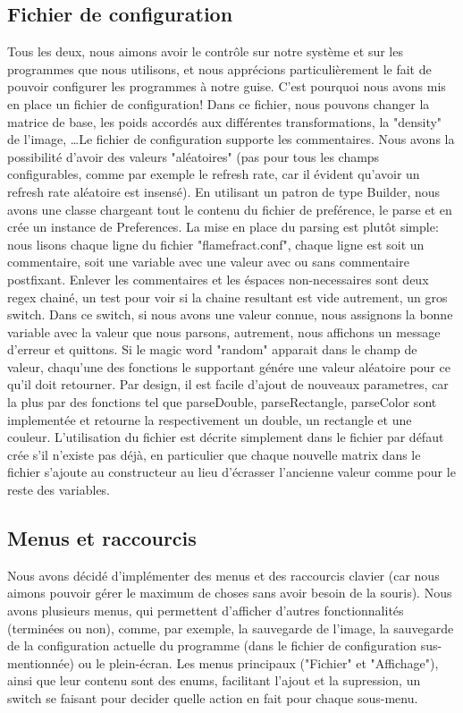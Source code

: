 \documentclass[a4paper]{article}
\begin{document}
\subsection*{Fichier de configuration}
Tous les deux, nous aimons avoir le contrôle sur notre système et sur les programmes que nous utilisons, et nous apprécions particulièrement le fait de pouvoir configurer les programmes à notre guise. C'est pourquoi nous avons mis en place un fichier de configuration! Dans ce fichier, nous pouvons changer la matrice de base, les poids accordés aux différentes transformations, la "density" de l'image, \ldots Le fichier de configuration supporte les commentaires. Nous avons la possibilité d'avoir des valeurs "aléatoires" (pas pour tous les champs configurables, comme par exemple le refresh rate, car il évident qu'avoir un refresh rate aléatoire est insensé).
En utilisant un patron de type Builder, nous avons une classe chargeant tout le contenu du fichier de preférence, le parse et en crée un instance de Preferences. La mise en place du parsing est plutôt simple: nous lisons chaque ligne du fichier "flamefract.conf", chaque ligne est soit un commentaire, soit une variable avec une valeur avec ou sans commentaire postfixant. Enlever les commentaires et les éspaces non-necessaires sont deux regex chainé, un test pour voir si la chaine resultant est vide autrement, un gros switch. Dans ce switch, si nous avons une valeur connue, nous assignons la bonne variable avec la valeur que nous parsons, autrement, nous affichons un message d'erreur et quittons. Si le magic word "random" apparait dans le champ de valeur, chaqu'une des fonctions le supportant génére une valeur aléatoire pour ce qu'il doit retourner. Par design, il est facile d'ajout de nouveaux parametres, car la plus par des fonctions tel que parseDouble, parseRectangle, parseColor sont implementée et retourne la respectivement un double, un rectangle et une couleur. L'utilisation du fichier est décrite simplement dans le fichier par défaut crée s'il n'existe pas déjà, en particulier que chaque nouvelle matrix dans le fichier s'ajoute au constructeur au lieu d'écrasser l'ancienne valeur comme pour le reste des variables.

\subsection*{Menus et raccourcis}
Nous avons décidé d'implémenter des menus et des raccourcis clavier (car nous aimons pouvoir gérer le maximum de choses sans avoir besoin de la souris). Nous avons plusieurs menus, qui permettent d'afficher d'autres fonctionnalités (terminées ou non), comme, par exemple, la sauvegarde de l'image, la sauvegarde de la configuration actuelle du programme (dans le fichier de configuration sus-mentionnée) ou le plein-écran.
Les menus principaux ("Fichier" et "Affichage"), ainsi que leur contenu sont des enums, facilitant l'ajout et la supression, un switch se faisant pour decider quelle action en fait pour chaque sous-menu.
\end{document}
